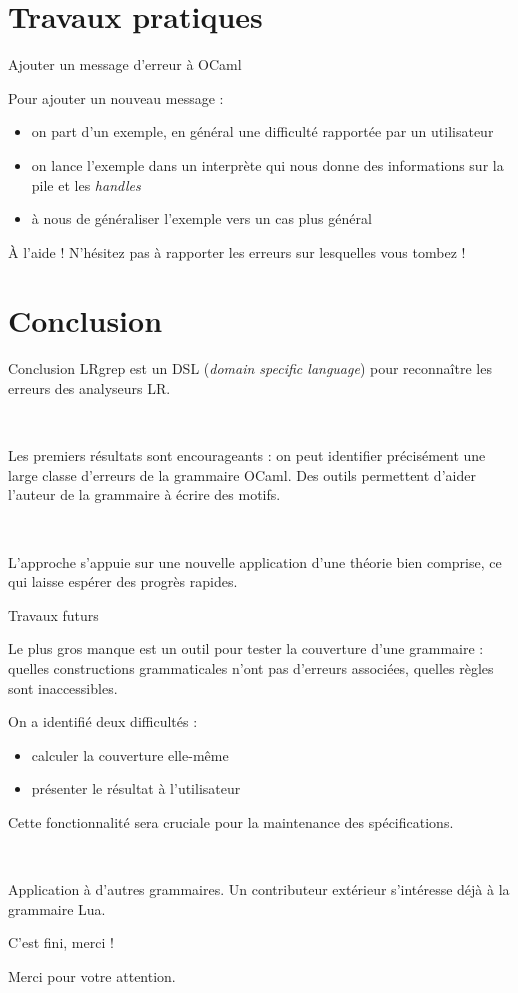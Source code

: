 \documentclass{beamer}          %
\begin{document}
\section{Travaux pratiques}

\begin{frame}{Ajouter un message d'erreur à OCaml}

  Pour ajouter un nouveau message :
  \begin{itemize}
    \item on part d'un exemple, en général une difficulté rapportée par un utilisateur
    \item on lance l'exemple dans un interprète qui nous donne des informations sur la pile et les {\em handles}
    \item à nous de généraliser l'exemple vers un cas plus général
  \end{itemize}
  \pause
  \begin{block}{À l'aide !}
    N'hésitez pas à rapporter les erreurs sur lesquelles vous tombez !
  \end{block}
\end{frame}

\section{Conclusion}

\begin{frame}{Conclusion}
  LRgrep est un DSL ({\em domain specific language}) pour reconnaître les
  erreurs des analyseurs LR.

\

  Les premiers résultats sont encourageants : on peut identifier précisément une large classe d'erreurs de la grammaire OCaml. Des outils permettent d'aider l'auteur de la grammaire à écrire des motifs.

\

  L'approche s'appuie sur une nouvelle application d'une théorie bien comprise, ce qui laisse espérer des progrès rapides.

\end{frame}

\begin{frame}{Travaux futurs}

Le plus gros manque est un outil pour tester la couverture d'une grammaire : quelles constructions grammaticales n'ont pas d'erreurs associées, quelles règles sont inaccessibles.

On a identifié deux difficultés :
\begin{itemize}
  \item calculer la couverture elle-même
  \item présenter le résultat à l'utilisateur
\end{itemize}

Cette fonctionnalité sera cruciale pour la maintenance des spécifications.

\

\pause
Application à d'autres grammaires.
Un contributeur extérieur s'intéresse déjà à la grammaire Lua.

\end{frame}

\begin{frame}{C'est fini, merci !}

  Merci pour votre attention.

\end{frame}
\end{document}
